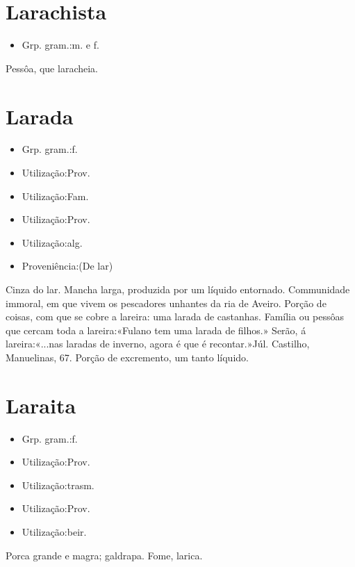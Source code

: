 \section{Larachista}
\begin{itemize}
\item {Grp. gram.:m.  e  f.}
\end{itemize}
Pessôa, que laracheia.
\section{Larada}
\begin{itemize}
\item {Grp. gram.:f.}
\end{itemize}
\begin{itemize}
\item {Utilização:Prov.}
\end{itemize}
\begin{itemize}
\item {Utilização:Fam.}
\end{itemize}
\begin{itemize}
\item {Utilização:Prov.}
\end{itemize}
\begin{itemize}
\item {Utilização:alg.}
\end{itemize}
\begin{itemize}
\item {Proveniência:(De \textunderscore lar\textunderscore )}
\end{itemize}
Cinza do lar.
Mancha larga, produzida por um líquido entornado.
Communidade immoral, em que vivem os pescadores unhantes da ria de Aveiro.
Porção de coisas, com que se cobre a lareira: \textunderscore uma larada de castanhas\textunderscore .
Família ou pessôas que cercam toda a lareira:«\textunderscore Fulano tem uma larada de filhos.\textunderscore »
Serão, á lareira:«\textunderscore ...nas laradas de inverno, agora é que é recontar.\textunderscore »Júl. Castilho, \textunderscore Manuelinas\textunderscore , 67.
Porção de excremento, um tanto líquido.
\section{Laraita}
\begin{itemize}
\item {Grp. gram.:f.}
\end{itemize}
\begin{itemize}
\item {Utilização:Prov.}
\end{itemize}
\begin{itemize}
\item {Utilização:trasm.}
\end{itemize}
\begin{itemize}
\item {Utilização:Prov.}
\end{itemize}
\begin{itemize}
\item {Utilização:beir.}
\end{itemize}
Porca grande e magra; galdrapa.
Fome, larica.
